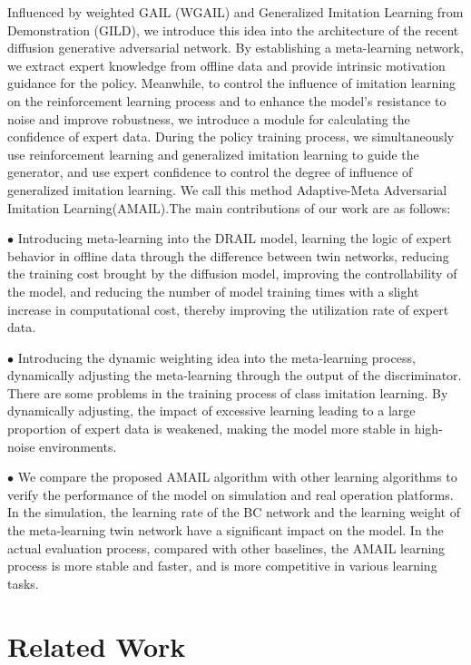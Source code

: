 \documentclass[lettersize,journal]{IEEEtran}
\begin{document}
Influenced by weighted GAIL (WGAIL) and Generalized Imitation Learning from Demonstration (GILD), we introduce this idea into the architecture of the recent diffusion generative adversarial network. By establishing a meta-learning network, we extract expert knowledge from offline data and provide intrinsic motivation guidance for the policy. Meanwhile, to control the influence of imitation learning on the reinforcement learning process and to enhance the model's resistance to noise and improve robustness, we introduce a module for calculating the confidence of expert data. During the policy training process, we simultaneously use reinforcement learning and generalized imitation learning to guide the generator, and use expert confidence to control the degree of influence of generalized imitation learning. We call this method Adaptive-Meta Adversarial Imitation Learning(AMAIL).The main contributions of our work are as follows:

$\bullet$ Introducing meta-learning into the DRAIL model, learning the logic of expert behavior in offline data through the difference between twin networks, reducing the training cost brought by the diffusion model, improving the controllability of the model, and reducing the number of model training times with a slight increase in computational cost, thereby improving the utilization rate of expert data.

$\bullet$ Introducing the dynamic weighting idea into the meta-learning process, dynamically adjusting the meta-learning through the output of the discriminator. There are some problems in the training process of class imitation learning. By dynamically adjusting, the impact of excessive learning leading to a large proportion of expert data is weakened, making the model more stable in high-noise environments.

$\bullet$ We compare the proposed AMAIL algorithm with other learning algorithms to verify the performance of the model on simulation and real operation platforms. In the simulation, the learning rate of the BC network and the learning weight of the meta-learning twin network have a significant impact on the model. In the actual evaluation process, compared with other baselines, the AMAIL learning process is more stable and faster, and is more competitive in various learning tasks.

\section{Related Work}
\end{document}
